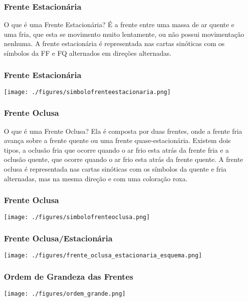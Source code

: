 \begin{frame}
\frametitle{Frente Estacionária}
\begin{block}{O que é uma Frente Estacionária?}
  É a frente entre uma massa de ar quente e uma fria, que esta se movimento
  muito lentamente, ou não possui movimentação nenhuma.  A frente estacionária
  é representada nas cartas sinóticas com os símbolos da FF e FQ alternados em
  direções alternadas.
\end{block}
\end{frame}


\begin{frame}
\frametitle{Frente Estacionária}
  \begin{center}
    \texttt{[image: ./figures/simbolofrenteestacionaria.png]}
  \end{center}
\end{frame}


\begin{frame}
\frametitle{Frente Oclusa}
\begin{block}{O que é uma Frente Oclusa?}
  Ela é composta por duas frentes, onde a frente fria avança sobre a frente
  quente ou uma frente quase-estacionária.  Existem dois tipos, a oclusão fria
  que ocorre quando o ar frio esta atrás da frente fria e a oclusão quente, que
  ocorre quando o ar frio esta atrás da frente quente.  A frente oclusa é
  representada nas cartas sinóticas com os símbolos da quente e fria alternadas,
  mas na mesma direção e com uma coloração roxa.
\end{block}
\end{frame}


\begin{frame}
\frametitle{Frente Oclusa}
  \begin{center}
    \texttt{[image: ./figures/simbolofrenteoclusa.png]}
  \end{center}
\end{frame}

\begin{frame}
\frametitle{Frente Oclusa/Estacionária}
  \begin{center}
    \texttt{[image: ./figures/frente\_oclusa\_estacionaria\_esquema.png]}
  \end{center}
\end{frame}

\begin{frame}
\frametitle{Ordem de Grandeza das Frentes}
  \begin{center}
    \texttt{[image: ./figures/ordem\_grande.png]}
  \end{center}
\end{frame}


